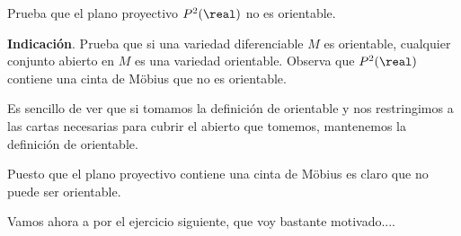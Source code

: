 \begin{problem}[10]
Prueba que el plano proyectivo $P^2(\real)$ no es orientable.

\textbf{Indicación}. Prueba que si una variedad diferenciable $M$ es orientable, cualquier conjunto abierto en $M$ es una variedad orientable. Observa que $P^2(\real)$ contiene una cinta de Möbius que no es orientable.

\solution


Es sencillo de ver que si tomamos la definición de orientable y nos restringimos a las cartas necesarias para cubrir el abierto que tomemos, mantenemos la definición de orientable.

Puesto que el plano proyectivo contiene una cinta de Möbius es claro que no puede ser orientable.

\end{problem}

Vamos ahora a por el ejercicio siguiente, que voy bastante motivado....


